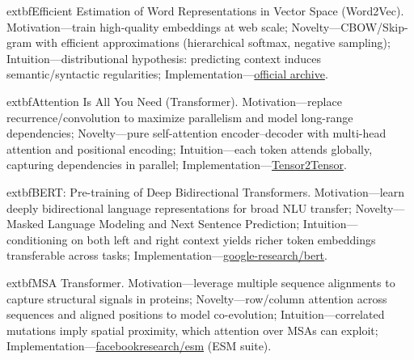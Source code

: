 	extbf{Efficient Estimation of Word Representations in Vector Space (Word2Vec).} Motivation—train high-quality embeddings at web scale; Novelty—CBOW/Skip-gram with efficient approximations (hierarchical softmax, negative sampling); Intuition—distributional hypothesis: predicting context induces semantic/syntactic regularities; Implementation—\href{https://code.google.com/archive/p/word2vec/}{official archive}.

	extbf{Attention Is All You Need (Transformer).} Motivation—replace recurrence/convolution to maximize parallelism and model long-range dependencies; Novelty—pure self-attention encoder–decoder with multi-head attention and positional encoding; Intuition—each token attends globally, capturing dependencies in parallel; Implementation—\href{https://github.com/tensorflow/tensor2tensor}{Tensor2Tensor}.

	extbf{BERT: Pre-training of Deep Bidirectional Transformers.} Motivation—learn deeply bidirectional language representations for broad NLU transfer; Novelty—Masked Language Modeling and Next Sentence Prediction; Intuition—conditioning on both left and right context yields richer token embeddings transferable across tasks; Implementation—\href{https://github.com/google-research/bert}{google-research/bert}.

	extbf{MSA Transformer.} Motivation—leverage multiple sequence alignments to capture structural signals in proteins; Novelty—row/column attention across sequences and aligned positions to model co-evolution; Intuition—correlated mutations imply spatial proximity, which attention over MSAs can exploit; Implementation—\href{https://github.com/facebookresearch/esm}{facebookresearch/esm} (ESM suite).
